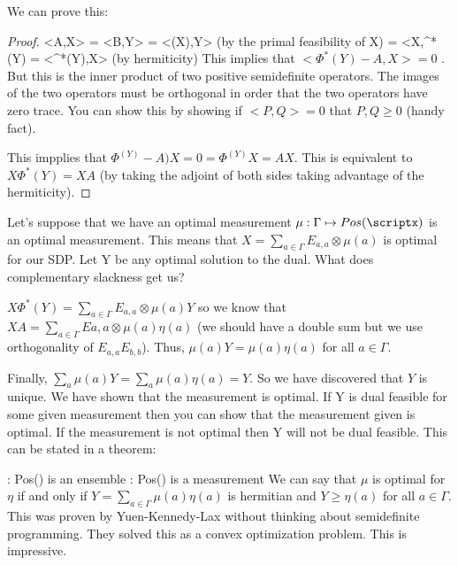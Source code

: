\documentclass{article}
\begin{document}
        We can prove this:
        
        \begin{proof}
            <A,X> = <B,Y> = <\Phi(X),Y> (by the primal feasibility of X)
             = <X,\Phi^*(Y) = <\Phi^*(Y),X> (by hermiticity)
             This implies that $ <\Phi^*(Y) - A , X> = 0 $ . But this is
             the inner product of two positive semidefinite operators.
             The images of the two operators must be orthogonal in order
             that the two operators have zero trace. You can show this
             by showing if $<P,Q> = 0$ that $P,Q \ge 0$ (handy fact).

         This impplies that $\Phi^(Y)-A)X = 0 = \Phi^(Y)X = AX$. This is
         equivalent to $X\Phi^*(Y) = XA$ (by taking the adjoint of both
         sides taking advantage of the hermiticity).
        \end{proof}

        Let's suppose that we have an optimal measurement $\mu : \Gamma
        \mapsto Pos(\scriptx)$ is an optimal measurement. This means
        that $X = \sum\limits_{a \in \Gamma} E_{a,a} \otimes \mu(a)$ is
        optimal for our SDP. Let Y be any optimal solution to the dual.
        What does complementary slackness get us?

        $X\Phi^*(Y) = \sum\limits_{a \in \Gamma} E_{a,a} \otimes \mu(a)
        Y$ so we know that $XA = \sum\limits_{a \in \Gamma} E{a,a}
        \otimes \mu(a) \eta(a)$ (we should have a double sum but we use
        orthogonality of $E_{a,a}E_{b,b}$). Thus, $\mu(a)Y =
        \mu(a)\eta(a)$ for all $a \in \Gamma$.

        Finally, $\sum_a \mu(a)Y = \sum_a \mu(a)\eta(a) = Y$. So we
        have discovered that $Y$ is unique. We have shown that the
        measurement is optimal. If Y is dual feasible for some given
        measurement then you can show that the measurement given is
        optimal. If the measurement is not optimal then Y will not be
        dual feasible. This can be stated in a theorem:

        \begin{theorem}
            \eta: \Gamma \in Pos(\scriptx) is an ensemble
            \mu: \Gamma \mapsto Pos(\scriptx) is a measurement
            We can say that $\mu$ is optimal for $\eta$ if and only if
            $Y = \sum\limits_{a\in \Gamma} \mu(a) \eta(a)$ is hermitian
            and $Y \ge \eta(a)$ for all $a \in \Gamma$. This was proven
            by Yuen-Kennedy-Lax without thinking about semidefinite
            programming. They solved this as a convex optimization
            problem. This is impressive.
        \end{theorem}
\end{document}
